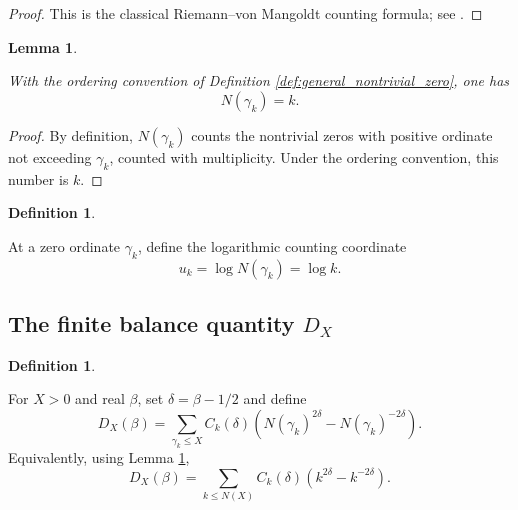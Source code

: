 \documentclass[11pt]{amsart}
\numberwithin{equation}{section}
\theoremstyle{plain}
\newtheorem{lemma}[theorem]{Lemma}
\theoremstyle{definition}
\newtheorem{definition}[theorem]{Definition}
\theoremstyle{remark}
\begin{document}
\begin{proof}
This is the classical Riemann--von Mangoldt counting formula; see \cite{Titchmarsh1986,Edwards2001,IwaniecKowalski2004}.
\end{proof}

\begin{lemma}
\label{lem:N_gamma_k_equals_k}

With the ordering convention of Definition \ref{def:general_nontrivial_zero}, one has
\begin{equation}
N(\gamma_k)=k.
\label{eq:N_gamma_k_equals_k}
\end{equation}

\end{lemma}

\begin{proof}
By definition, \(N(\gamma_k)\) counts the nontrivial zeros with positive ordinate not exceeding \(\gamma_k\), counted with multiplicity.  Under the ordering convention, this number is \(k\).
\end{proof}

\begin{definition}
\label{def:logarithmic_counting_coordinate_Dx}

At a zero ordinate \(\gamma_k\), define the logarithmic counting coordinate
\begin{equation}
u_k
=
\log N(\gamma_k)
=
\log k.
\label{eq:logarithmic_counting_coordinate_Dx}
\end{equation}

\end{definition}

\subsection{The finite balance quantity \texorpdfstring{\(D_X\)}{D_X}}
\label{subsec:finite_balance_quantity_DX}

\begin{definition}
\label{def:DX_beta_balance}

For \(X>0\) and real \(\beta\), set \(\delta=\beta-1/2\) and define
\begin{equation}
D_X(\beta)
=
\sum_{\gamma_k\leq X}
C_k(\delta)
\left(
N(\gamma_k)^{2\delta}
-
N(\gamma_k)^{-2\delta}
\right).
\label{eq:DX_beta_balance}
\end{equation}
Equivalently, using Lemma \ref{lem:N_gamma_k_equals_k},
\begin{equation}
D_X(\beta)
=
\sum_{k\leq N(X)}
C_k(\delta)
\left(
k^{2\delta}-k^{-2\delta}
\right).
\label{eq:DX_beta_indexed_balance}
\end{equation}

\end{definition}
\end{document}
